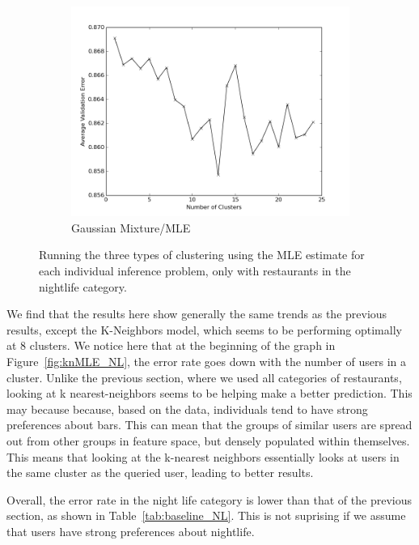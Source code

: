 \documentclass[11pt]{article}
\begin{document}
\begin{figure}[h!]
\begin{subfigure}[h!]{0.33\textwidth}
        \includegraphics[width=\textwidth]{NL_GM_mle.png}
        \caption{Gaussian Mixture/MLE}
        \label{fig:gmMLE_NL}
    \end{subfigure}
    \caption{Running the three types of clustering using the MLE estimate for each individual inference problem, only with restaurants in the nightlife category.}
    \label{fig:MLE_NL}
\end{figure}

We find that the results here show generally the same trends as the previous results, except the K-Neighbors model, which seems to be performing optimally at 8 clusters. We notice here that at the beginning of the graph in Figure~\ref{fig:knMLE_NL}, the error rate goes down with the number of users in a cluster. Unlike the previous section, where we used all categories of restaurants, looking at k nearest-neighbors seems to be helping make a better prediction. This may because because, based on the data, individuals tend to have strong preferences about bars. This can mean that the groups of similar users are spread out from other groups in feature space, but densely populated within themselves. This means that looking at the k-nearest neighbors essentially looks at users in the same cluster as the queried user, leading to better results.

Overall, the error rate in the night life category is lower than that of the previous section, as shown in Table~\ref{tab:baseline_NL}. This is not suprising if we assume that users have strong preferences about nightlife.
\end{document}
